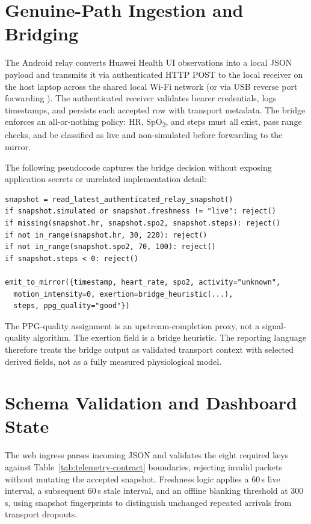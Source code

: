 \section{Genuine-Path Ingestion and Bridging}
The Android relay converts Huawei Health UI observations into a local JSON payload and transmits it via authenticated HTTP POST to the local receiver on the host laptop across the shared local Wi-Fi network (or via USB reverse port forwarding ). The authenticated receiver validates bearer credentials, logs timestamps, and persists each accepted row with transport metadata. The bridge enforces an all-or-nothing policy: HR, SpO\textsubscript{2}, and steps must all exist, pass range checks, and be classified as live and non-simulated before forwarding to the mirror.

The following pseudocode captures the bridge decision without exposing application secrets or unrelated implementation detail:

\needspace{20mm}
\begin{lstlisting}[caption={Genuine-only bridge policy, simplified.},label={lst:bridge-policy}]
snapshot = read_latest_authenticated_relay_snapshot()
if snapshot.simulated or snapshot.freshness != "live": reject()
if missing(snapshot.hr, snapshot.spo2, snapshot.steps): reject()
if not in_range(snapshot.hr, 30, 220): reject()
if not in_range(snapshot.spo2, 70, 100): reject()
if snapshot.steps < 0: reject()

emit_to_mirror({timestamp, heart_rate, spo2, activity="unknown",
  motion_intensity=0, exertion=bridge_heuristic(...),
  steps, ppg_quality="good"})
\end{lstlisting}

The PPG-quality assignment is an upstream-completion proxy, not a signal-quality algorithm. The exertion field is a bridge heuristic. The reporting language therefore treats the bridge output as validated transport context with selected derived fields, not as a fully measured physiological model.

\section{Schema Validation and Dashboard State}
The web ingress parses incoming JSON and validates the eight required keys against Table~\ref{tab:telemetry-contract} boundaries, rejecting invalid packets without mutating the accepted snapshot. Freshness logic applies a 60\,s live interval, a subsequent 60\,s stale interval, and an offline blanking threshold at 300\,s, using snapshot fingerprints to distinguish unchanged repeated arrivals from transport dropouts.

